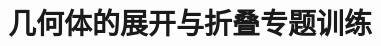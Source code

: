 \documentclass[final]{tiku}
\title{几何体的展开与折叠专题训练}
\begin{document}
\begin{enumerate}
\foreachproblem{%
\item%
\label{prob:\thisproblemlabel}
\thisproblem%
}
\end{enumerate}
\end{document}
